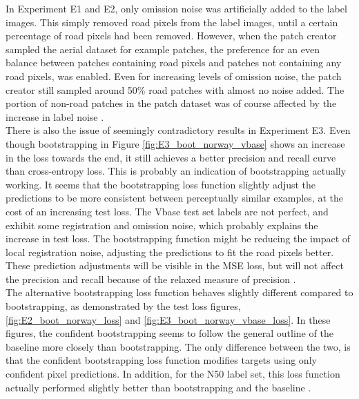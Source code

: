 In Experiment E1 and E2, only omission noise was artificially added to the label images. This simply removed road pixels from the label images, until a certain percentage of road pixels had been removed. However, when the patch creator sampled the aerial dataset for example patches, the preference for an even balance between patches containing road pixels and patches not containing any road pixels, was enabled. Even for increasing levels of omission noise, the patch creator still sampled around 50\% road patches with almost no noise added. The portion of non-road patches in the patch dataset was of course affected by the increase in label noise .\\

There is also the issue of seemingly contradictory results in Experiment E3. Even though bootstrapping in Figure \ref{fig:E3_boot_norway_vbase} shows an increase in the loss towards the end, it still achieves a better precision and recall curve than cross-entropy loss. This is probably an indication of bootstrapping actually working. It seems that the bootstrapping loss function slightly adjust the predictions to be more consistent between perceptually similar examples, at the cost of an increasing test loss. The Vbase test set labels are not perfect, and exhibit some registration and omission noise, which probably explains the increase in test loss. The bootstrapping function might be reducing the impact of local registration noise,  adjusting the predictions to fit the road pixels better. These prediction adjustments will be visible in the MSE loss, but will not affect the precision and recall because of the relaxed measure of precision . \\

The alternative bootstrapping loss function  behaves slightly different compared to bootstrapping, as demonstrated by the test loss figures, \ref{fig:E2_boot_norway_loss} and \ref{fig:E3_boot_norway_vbase_loss}. In these figures, the confident bootstrapping seems to follow the general outline of the baseline more closely than bootstrapping. The only difference between the two, is that the confident bootstrapping loss function modifies targets using only confident pixel predictions. In addition, for the N50 label set, this loss function actually performed slightly better than bootstrapping and the baseline .\\ 

